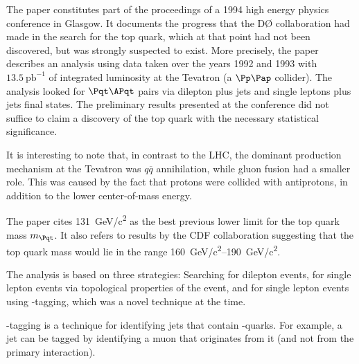 

The paper\cite{dzero} constitutes part of the proceedings of a 1994 high energy physics conference in Glasgow.
It documents the progress that the DØ collaboration had made in the search for the top quark, which at that point had not been discovered, but was strongly suspected to exist.
More precisely, the paper describes an analysis using data taken over the years 1992 and 1993 with $\SI{13.5}{\pico\barn}^{-1}$ of integrated luminosity at the Tevatron (a $\Pp\Pap$ collider).
The analysis looked for $\Pqt\APqt$ pairs via dilepton plus jets and single leptons plus jets final states.
The preliminary results presented at the conference did not suffice to claim a discovery of the top quark with the necessary statistical significance.

It is interesting to note that, in contrast to the LHC, the dominant \Pqt\!\!\APqt production mechanism at the Tevatron was $q\overline{q}$ annihilation, while gluon fusion had a smaller role.
This was caused by the fact that protons were collided with antiprotons, in addition to the lower center-of-mass energy.

The paper cites \SI{131}{GeV/c^2} as the best previous lower limit for the top quark mass $m_{\Pqt}$.
It also refers to results by the CDF collaboration\cite{cdf} suggesting that the top quark mass would lie in the range \SIrange{160}{190}{GeV/c^2}.

The analysis is based on three strategies: Searching for dilepton events, for single lepton events via topological properties of the event, and for single lepton events using \Pqb-tagging, which was a novel technique at the time.

\Pqb-tagging is a technique for identifying jets that contain \Pqb-quarks.
For example, a jet can be tagged by identifying a muon that originates from it (and not from the primary interaction).

